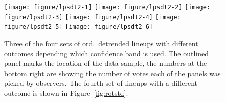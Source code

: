 \documentclass[12pt]{article}\usepackage[]{graphicx}\usepackage[]{color}
\newenvironment{knitrout}{}{} %
\begin{document}
\begin{appendix}
\begin{figure}
\centering
\begin{knitrout}
\color{fgcolor}
\texttt{[image: figure/lpsdt2-1]} 
\texttt{[image: figure/lpsdt2-2]} 
\texttt{[image: figure/lpsdt2-3]} 
\texttt{[image: figure/lpsdt2-4]} 
\texttt{[image: figure/lpsdt2-5]} 
\texttt{[image: figure/lpsdt2-6]} 

\end{knitrout}
\caption{\label{fig:lpsdt2} Three of the  four sets of ord.\ detrended  lineups with different outcomes depending which confidence band is used. The outlined panel marks the  location of the data sample, the numbers at the bottom right are showing the number of votes each of the panels was picked by observers. The fourth set of lineups with a different outcome is shown in Figure~\ref{fig:rotstd}. }
\end{figure}
\afterpage{\clearpage}








\end{appendix}
\end{document}

